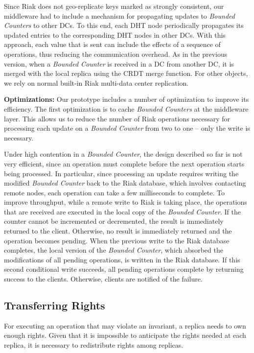 \documentclass[conference]{IEEEtran}
\newcommand{\InvCounter}{\emph{Bounded Counter}}
\newcommand{\InvCounters}{\emph{Bounded Counters}}
\begin{document}
Since Riak does not geo-replicate keys marked as strongly consistent,
our middleware had to include a mechanism for propagating updates to \InvCounters{} 
to other DCs. 
To this end, each DHT node periodically propagates its updated entries to 
the corresponding DHT nodes in other DCs. 
With this approach, each value that is sent can include the effects of 
a sequence of operations, thus reducing the communication overhead.
As in the previous version, when a \InvCounter{} is received in a DC from another DC,
it is merged with the local replica using the CRDT merge function.
For other objects, we rely on normal built-in Riak multi-data center replication.


{\bf Optimizations:} 
Our prototype includes a number of optimization to improve its efficiency.
The first optimization is to cache \InvCounters{} at the middleware layer. 
This allows us to reduce the number of Riak operations necessary for processing 
each update on a \InvCounter{} from two to one -- only the write is necessary.

Under high contention in a \InvCounter{}, the design described so far is not very efficient, 
since an operation must complete before the next operation starts being processed. 
In particular, since processing an update requires writing the modified \InvCounter{}
back to the Riak database, which involves contacting remote nodes, each operation can 
take a few milliseconds to complete. 
To improve throughput, while a remote write to Riak is taking place, the operations 
that are received are executed in the local copy of the \InvCounter{}. 
If the counter cannot be incremented or decremented, the result is immediately returned to the client. 
Otherwise, no result is immediately returned and the operation becomes pending. 
When the previous write to the Riak database completes, the local version of 
the \InvCounter{}, which absorbed the modifications of all pending operations, 
is written in the Riak database.
If this second conditional write succeeds, all pending operations complete by 
returning success to the clients. 
Otherwise, clients are notified of the failure.


\subsection{Transferring Rights}

For executing an operation that may violate an invariant, a replica needs to own 
enough rights.
Given that it is impossible to anticipate the rights needed at each replica, it is
necessary to redistribute rights among replicas.
\end{document}

